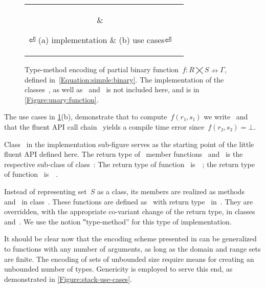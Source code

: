 \begin{figure}[hbt]
  \caption{\label{Figure:simple:binary}%
  Type-method encoding of partial binary function~$f: R⨉S↛Γ$,
  defined in~\cref{Equation:simple:binary}. The implementation of the classes~, 
  as well as~ and~ is not included here, and is
  in \cref{Figure:unary:function}.}

  \begin{tabular}{cc}
   \hspace{-2.5ex}
   \parbox[c]{0.57\linewidth}{%
   }
   &
   \hspace{-2.5ex}
   \parbox[c]{0.48\linewidth}{%
   }
⏎
   \hspace{-7ex}(a) implementation & \hspace{-5ex}(b) use cases⏎
  \end{tabular}
\end{figure}

The use cases in \cref{Figure:simple:binary}(b), demonstrate
  that to compute~$f(r₁,s₁)$ we write~
  and that the fluent API call chain~ yields
  a compile time error since~$f(r₂, s₂)=⊥$.

Class~ in the implementation sub-figure serves as
  the starting point of the little fluent API defined here.
The return type of~ member functions~ and~
  is the respective sub-class of class~:
The return type of function~ is~~;
  the return type of function~ is~~.

Instead of representing set~$S$ as a class,
  its members are realized as methods~ and~ in  class~.
These functions are defined as~ with return type~
  in~. 
They are overridden, with the appropriate co-variant change of the return type,
  in classes~ and~.
We use the notion ‟type-method” for this type of implementation.

It should be clear now that the encoding scheme presented in  can be generalized to functions
  with any number of arguments, as long as the domain and range sets are finite. 
The encoding of sets of unbounded size require means for creating an unbounded 
  number of types. 
Genericity is employed to serve this end, as demonstrated in \cref{Figure:stack-use-cases}.


